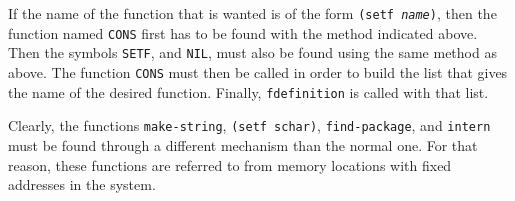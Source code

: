 If the name of the function that is wanted is of the form
\texttt{(setf \emph{name})}, then the function named \texttt{CONS}
first has to be found with the method indicated above.  Then the 
symbols \texttt{SETF}, and \texttt{NIL}, must also be found using the
same method as above.  The function \texttt{CONS} must then be called
in order to build the list that gives the name of the desired
function.  Finally, \texttt{fdefinition} is called with that list. 

Clearly, the functions \texttt{make-string}, \texttt{(setf schar)},
\texttt{find-package}, and \texttt{intern} must be found through a
different mechanism than the normal one.  For that reason, these
functions are referred to from memory locations with fixed addresses
in the system.  


